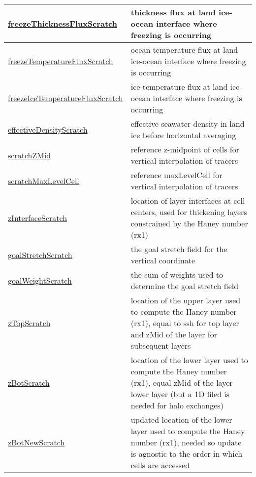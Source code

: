 {\begin{center}
\begin{longtable}{| p{2.0in} | p{4.0in} |}
    \hline
    \hyperref[subsec:var_sec_scratch_freezeThicknessFluxScratch]{freezeThicknessFluxScratch} & thickness flux at land ice-ocean interface where freezing is occurring \\
    \hline
    \hyperref[subsec:var_sec_scratch_freezeTemperatureFluxScratch]{freezeTemperatureFluxScratch} & ocean temperature flux at land ice-ocean interface where freezing is occurring \\
    \hline
    \hyperref[subsec:var_sec_scratch_freezeIceTemperatureFluxScratch]{freezeIceTemperatureFluxScratch} & ice temperature flux at land ice-ocean interface where freezing is occurring \\
    \hline
    \hyperref[subsec:var_sec_scratch_effectiveDensityScratch]{effectiveDensityScratch} & effective seawater density in land ice before horizontal averaging \\
    \hline
    \hyperref[subsec:var_sec_scratch_scratchZMid]{scratchZMid} & reference z-midpoint of cells for vertical interpolation of tracers \\
    \hline
    \hyperref[subsec:var_sec_scratch_scratchMaxLevelCell]{scratchMaxLevelCell} & reference maxLevelCell for vertical interpolation of tracers \\
    \hline
    \hyperref[subsec:var_sec_scratch_zInterfaceScratch]{zInterfaceScratch} & location of layer interfaces at cell centers, used for thickening layers constrained by the Haney number (rx1) \\
    \hline
    \hyperref[subsec:var_sec_scratch_goalStretchScratch]{goalStretchScratch} & the goal stretch field for the vertical coordinate \\
    \hline
    \hyperref[subsec:var_sec_scratch_goalWeightScratch]{goalWeightScratch} & the sum of weights used to determine the goal stretch field \\
    \hline
    \hyperref[subsec:var_sec_scratch_zTopScratch]{zTopScratch} & location of the upper layer used to compute the Haney number (rx1), equal to ssh for top layer and zMid of the layer for subsequent layers \\
    \hline
    \hyperref[subsec:var_sec_scratch_zBotScratch]{zBotScratch} & location of the lower layer used to compute the Haney number (rx1), equal zMid of the layer lower layer (but a 1D filed is needed for halo exchanges) \\
    \hline
    \hyperref[subsec:var_sec_scratch_zBotNewScratch]{zBotNewScratch} & updated location of the lower layer used to compute the Haney number (rx1), needed so update is agnostic to the order in which cells are accessed \\

\end{longtable}
\end{center}}

